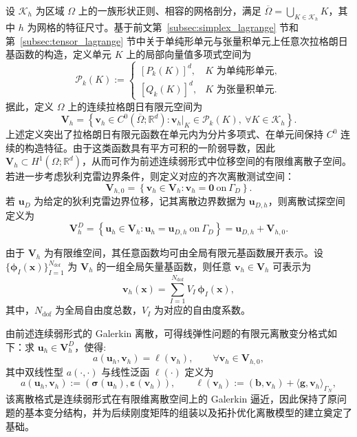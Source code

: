 设 $\mathcal{K}_h$ 为区域 $\Omega$ 上的一族形状正则、相容的网格剖分，满足 $\overline{\Omega}=\bigcup_{K\in\mathcal{K}_h}K$，其中 $h$ 为网格的特征尺寸。基于前文第~\ref{subsec:simplex_lagrange} 节和第~\ref{subsec:tensor_lagrange} 节中关于单纯形单元与张量积单元上任意次拉格朗日基函数的构造，定义单元 $K$ 上的局部向量值多项式空间为
\[
\boldsymbol{\mathcal P}_k(K) := 
\begin{cases} 
	[P_k(K)]^d, & K \text{ 为单纯形单元},\\[4pt] [Q_k(K)]^d, & K \text{ 为张量积单元}. 
\end{cases}
\]
据此，定义 $\Omega$ 上的连续拉格朗日有限元空间为
\[
\boldsymbol{V}_h = \left\{ \boldsymbol{v}_h\in C^0(\overline{\Omega};\mathbb{R}^d): \boldsymbol{v}_h|_K\in \boldsymbol{\mathcal P}_k(K),\ \forall K\in\mathcal{K}_h \right\}.
\]
上述定义突出了拉格朗日有限元函数在单元内为分片多项式、在单元间保持 $C^0$ 连续的构造特征。由于这类函数具有平方可积的一阶弱导数，因此 $\boldsymbol{V}_h\subset H^1(\Omega;\mathbb{R}^d)$，从而可作为前述连续弱形式中位移空间的有限维离散子空间。若进一步考虑狄利克雷边界条件，则定义对应的齐次离散测试空间：
\[
\boldsymbol{V}_{h,0} = \left\{ \boldsymbol{v}_h\in\boldsymbol{V}_h: \boldsymbol{v}_h=\boldsymbol{0}\ \text{on}\ \Gamma_D \right\}.
\]
若 $\boldsymbol{u}_D$ 为给定的狄利克雷边界位移，记其离散边界数据为 $\boldsymbol{u}_{D,h}$，则离散试探空间定义为
\[
\boldsymbol{V}_h^D = \left\{ \boldsymbol{u}_h\in\boldsymbol{V}_h: \boldsymbol{u}_h=\boldsymbol{u}_{D,h}\ \text{on}\ \Gamma_D \right\} = \boldsymbol{u}_{D,h}+\boldsymbol{V}_{h,0}.
\]

由于 $\boldsymbol{V}_h$ 为有限维空间，其任意函数均可由全局有限元基函数展开表示。设 $\{\boldsymbol{\phi}_I(\boldsymbol{x})\}_{I=1}^{N_{\text{dof}}}$ 为 $\boldsymbol{V}_h$ 的一组全局矢量基函数，则任意 $\boldsymbol{v}_h\in\boldsymbol{V}_h$ 可表示为
\[
\boldsymbol{v}_h(\boldsymbol{x}) = \sum_{I=1}^{N_{\mathrm{dof}}} V_I\,\boldsymbol{\phi}_I(\boldsymbol{x}),
\]
其中，$N_{\mathrm{dof}}$ 为全局自由度总数，$V_I$ 为对应的自由度系数。

由前述连续弱形式的 Galerkin 离散，可得线弹性问题的有限元离散变分格式如下：求 $\boldsymbol{u}_h\in\boldsymbol{V}_h^D$，使得:
\begin{equation} \label{eq:ch3_discrete_weak_form}
	a(\boldsymbol{u}_h,\boldsymbol{v}_h)=\ell(\boldsymbol{v}_h), \qquad \forall \boldsymbol{v}_h\in\boldsymbol{V}_{h,0},
\end{equation}
其中双线性型 $a(\cdot,\cdot)$ 与线性泛函 $\ell(\cdot)$ 定义为
\[
a(\boldsymbol{u}_h,\boldsymbol{v}_h) := (\boldsymbol{\sigma}(\boldsymbol{u}_h),\boldsymbol{\varepsilon}(\boldsymbol{v}_h)), \qquad \ell(\boldsymbol{v}_h) := (\boldsymbol{b},\boldsymbol{v}_h) + \langle\boldsymbol{g},\boldsymbol{v}_h\rangle_{\Gamma_N},
\]
该离散格式是连续弱形式在有限维离散空间上的 Galerkin 逼近，因此保持了原问题的基本变分结构，并为后续刚度矩阵的组装以及拓扑优化离散模型的建立奠定了基础。


